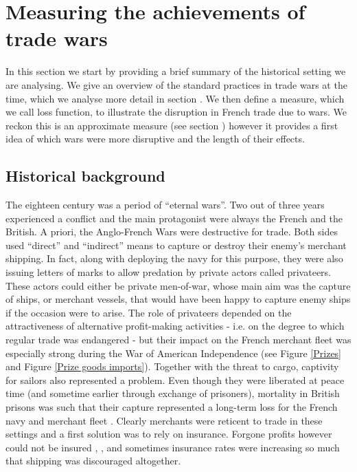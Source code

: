 \documentclass[12pt,a4paper,notitlepage,english]{article}
\begin{document}
\section{Measuring the achievements of trade wars}
In this section we start by providing a brief summary of the historical setting we are analysing. We give an overview of the standard practices in trade wars at the time, which we analyse more detail in section \label{sec:wartime_strategies}. We then define a measure, which we call loss function, to illustrate the disruption in French trade due to wars. We reckon this is an approximate measure (see section \label{sec:cost_benefit}) however it provides a first idea of which wars were more disruptive and the length of their effects. 

\subsection{Historical background}
\label{sec:historical_background}
The eighteen century was a period of ``eternal wars''. Two out of three years experienced a conflict and the main protagonist were always the French and the British. 
A priori, the Anglo-French Wars were destructive for trade. 
Both sides used ``direct'' and ``indirect'' means to capture or destroy their enemy's merchant shipping. In fact, along with deploying the navy for this purpose, they were also issuing letters of marks to allow predation by private actors called privateers. 
These actors could either be private men-of-war, whose main aim was the capture of ships, or merchant vessels, that would have been happy to capture enemy ships if the occasion were to arise.
The role of privateers depended on the attractiveness of alternative profit-making activities \cite[p. 673]{Villiers2002,Hillmann2011} - i.e. on the degree to which regular trade was endangered  - but their impact on the French merchant fleet was especially strong during the War of American Independence \cite[table 1]{Hillmann2011} (see Figure \ref{Prizes} and Figure \ref{Prize goods imports}).
Together with the threat to cargo, captivity for sailors also represented a problem. Even though they were liberated at peace time (and sometime earlier through exchange of prisoners), mortality in British prisons was such that their capture represented a long-term loss for the French navy and merchant fleet \cite{LeGoff1998}.
Clearly merchants were reticent to trade in these settings and a first solution was to rely on insurance. Forgone profits however could not be insured \cite[p. 160]{Ducoin1993}, \cite{Villiers2002}, \cite[p. 690-720]{Butel1973} and sometimes insurance rates were increasing so much that shipping was discouraged altogether. 
\end{document}
